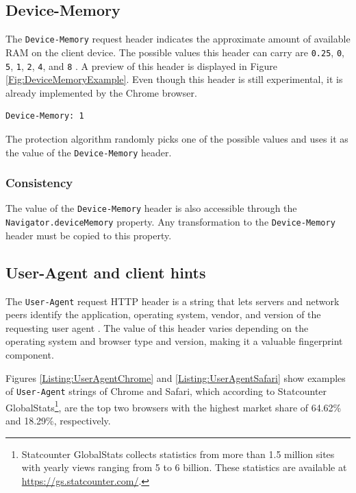 \subsection{Device-Memory}
\label{SubSection:DeviceMemory}

The \texttt{Device-Memory} request header indicates the approximate amount of available RAM on the client device. The possible values this header can carry are \verb|0.25|, \verb|0|, \verb|5|, \verb|1|, \verb|2|, \verb|4|, and \verb|8| \cite{MDN}. A preview of this header is displayed in Figure \ref{Fig:DeviceMemoryExample}. Even though this header is still experimental, it is already implemented by the Chrome browser.

\bigbreak

\begin{lstlisting}[caption={An example of Device-Memory header contents \cite{MDN}.}, label={Fig:DeviceMemoryExample}]
Device-Memory: 1
\end{lstlisting}

\medbreak

The protection algorithm randomly picks one of the possible values and uses it as the value of the \texttt{Device-Memory} header.

\subsubsection{Consistency}

The value of the \texttt{Device-Memory} header is also accessible through the \texttt{Navigator.deviceMemory} property. Any transformation to the \texttt{Device-Memory} header must be copied to this property.

\subsection{User-Agent and client hints}
\label{SubSection:UserAgentDesign}

The \texttt{User-Agent} request HTTP header is a string that lets servers and network peers identify the application, operating system, vendor, and version of the requesting user agent \cite{MDN}. The value of this header varies depending on the operating system and browser type and version, making it a valuable fingerprint component.

Figures \ref{Listing:UserAgentChrome} and \ref{Listing:UserAgentSafari} show examples of \texttt{User-Agent} strings of Chrome and Safari, which according to Statcounter GlobalStats\footnote{Statcounter GlobalStats collects statistics from more than 1.5 million sites with yearly views ranging from 5 to 6 billion. These statistics are available at \url{https://gs.statcounter.com/}.}, are the top two browsers with the highest market share of 64.62\% and 18.29\%, respectively.

